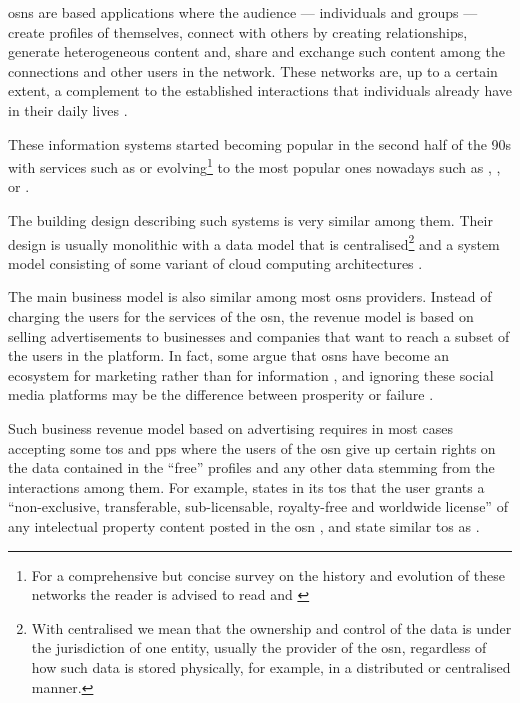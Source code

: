 \documentclass[showtrims]{kthesis}
\begin{document}
\Acp{osn} are \Internet based applications where the audience --- individuals and 
groups --- create profiles of themselves, connect with others by creating relationships, 
generate heterogeneous content and, share and exchange such content among the connections 
and other users in the network. These networks are, up to a certain extent, a complement 
to the established interactions that individuals already have in their daily lives 
\cite{SubrahmanyamRWE08}.

These information systems started becoming popular in the second half of the 90s 
with services such as \LiveJournal or \Friendster evolving\footnote{For a comprehensive 
but concise survey on the history and evolution of these networks the reader is 
advised to read \cite{boydE07} and \cite{HeidemannKP12}} to the most popular ones 
nowadays such as \Facebook, \LinkedIn, \Twitter or \GooglePlus.

The building design describing such systems is very similar among them. Their design 
is usually monolithic with a data model that is centralised\footnote{With centralised 
we mean that the ownership and control of the data is under the jurisdiction of 
one entity, usually the provider of the \ac{osn}, regardless of how such data is 
stored physically, for example, in a distributed or centralised manner.} and a system 
model consisting of some variant of cloud computing architectures \cite{PallisZD11}. 

The main business model is also similar among most \acp{osn} providers. Instead 
of charging the users for the services of the \ac{osn}, the revenue model is based 
on selling advertisements to businesses and companies that want to reach a subset 
of the users in the platform. In fact, some argue that \acp{osn} have become an 
ecosystem for marketing rather than for information \cite{HannaRC11}, and ignoring 
these social media platforms may be the difference between prosperity or failure 
\cite{HarrisR09}.

Such business revenue model based on advertising requires in most cases accepting 
some \ac{tos} and \acp{pp} where the users of the \ac{osn} give up certain rights 
on the data contained in the ``free'' profiles and any other data stemming from 
the interactions among them. For example, \Facebook states in its \ac{tos} that 
the user grants a ``non-exclusive, transferable, sub-licensable, royalty-free and 
worldwide license'' of any intelectual property content posted in the \ac{osn} \cite{Facebook15}, 
\LinkedIn and \Twitter state similar \ac{tos} as \Facebook \cite{LinkedIn14, Twitter16}.
\end{document}
